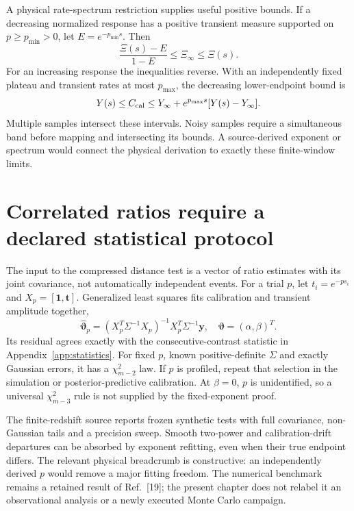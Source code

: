\documentclass[10pt,twocolumn,letterpaper]{article}
\begin{document}
A physical rate-spectrum restriction supplies useful positive bounds. If a decreasing normalized response has a positive transient measure supported on $p\ge p_{\min}>0$, let $E=e^{-p_{\min}s}$. Then
\[
 \frac{\Xi(s)-E}{1-E}\le \Xi_\infty\le \Xi(s).
\]
For an increasing response the inequalities reverse. With an independently fixed plateau and transient rates at most $p_{\max}$, the decreasing lower-endpoint bound is
\[
 Y(s)\le C_{\rm cal}\le Y_\infty+e^{p_{\max}s}[Y(s)-Y_\infty].
\]
Multiple samples intersect these intervals. Noisy samples require a simultaneous band before mapping and intersecting its bounds. A source-derived exponent or spectrum would connect the physical derivation to exactly these finite-window limits.

\section{Correlated ratios require a declared statistical protocol}
The input to the compressed distance test is a vector of ratio estimates with its joint covariance, not automatically independent events. For a trial $p$, let $t_i=e^{-ps_i}$ and $X_p=[\bm 1,\bm t]$. Generalized least squares fits calibration and transient amplitude together,
\[
 \widehat{\bm\vartheta}_p=(X_p^T\Sigma^{-1}X_p)^{-1}X_p^T\Sigma^{-1}\bm y,
 \quad\bm\vartheta=(\alpha,\beta)^T.
\]
Its residual agrees exactly with the consecutive-contrast statistic in Appendix~\ref{app:statistics}. For fixed $p$, known positive-definite $\Sigma$ and exactly Gaussian errors, it has a $\chi^2_{m-2}$ law. If $p$ is profiled, repeat that selection in the simulation or posterior-predictive calibration. At $\beta=0$, $p$ is unidentified, so a universal $\chi^2_{m-3}$ rule is not supplied by the fixed-exponent proof.

The finite-redshift source reports frozen synthetic tests with full covariance, non-Gaussian tails and a precision sweep. Smooth two-power and calibration-drift departures can be absorbed by exponent refitting, even when their true endpoint differs. The relevant physical breadcrumb is constructive: an independently derived $p$ would remove a major fitting freedom. The numerical benchmark remains a retained result of Ref.~[19]; the present chapter does not relabel it an observational analysis or a newly executed Monte Carlo campaign.
\end{document}
